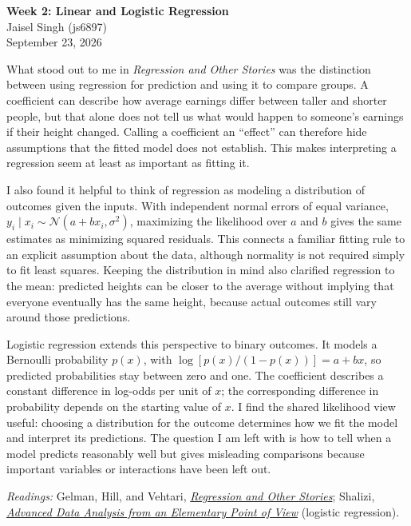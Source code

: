 \documentclass[12pt]{article}
\begin{document}
\begin{flushleft}
\textbf{Week 2: Linear and Logistic Regression} \\
Jaisel Singh (js6897) \\
September 23, 2026
\end{flushleft}

\vspace{0.1in}

What stood out to me in \emph{Regression and Other Stories} was the distinction
between using regression for prediction and using it to compare groups. A
coefficient can describe how average earnings differ between taller and shorter
people, but that alone does not tell us what would happen to someone's earnings
if their height changed. Calling a coefficient an ``effect'' can therefore hide
assumptions that the fitted model does not establish. This makes interpreting a
regression seem at least as important as fitting it.

I also found it helpful to think of regression as modeling a distribution of
outcomes given the inputs. With independent normal errors of equal variance,
$y_i \mid x_i \sim \mathcal{N}(a+bx_i,\sigma^2)$, maximizing the likelihood over
$a$ and $b$ gives the same estimates as minimizing squared residuals. This
connects a familiar fitting rule to an explicit assumption about the data,
although normality is not required simply to fit least squares. Keeping the
distribution in mind also clarified regression to the mean: predicted heights
can be closer to the average without implying that everyone eventually has the
same height, because actual outcomes still vary around those predictions.

Logistic regression extends this perspective to binary outcomes. It models a
Bernoulli probability $p(x)$, with $\log[p(x)/(1-p(x))]=a+bx$, so predicted
probabilities stay between zero and one. The coefficient describes a constant
difference in log-odds per unit of $x$; the corresponding difference in
probability depends on the starting value of $x$. I find the shared likelihood
view useful: choosing a distribution for the outcome determines how we fit the
model and interpret its predictions. The question I am left with is how to tell
when a model predicts reasonably well but gives misleading comparisons because
important variables or interactions have been left out.

\vspace{0.05in}
{\footnotesize
\textit{Readings:} Gelman, Hill, and Vehtari, \href{https://avehtari.github.io/ROS-Examples/}{\emph{Regression and Other Stories}};
Shalizi, \href{https://www.stat.cmu.edu/~cshalizi/ADAfaEPoV/}{\emph{Advanced Data Analysis from an Elementary Point of View}} (logistic regression).
\par}
\end{document}
